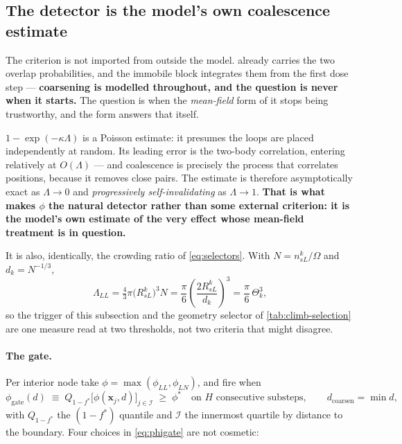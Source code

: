 \documentclass{article}
\begin{document}
\subsection{The detector is the model's own coalescence estimate}
\label{sec:dcoarsen}

The criterion is not imported from outside the model.  already
carries the two overlap probabilities, and the immobile block integrates them
from the first dose step --- \textbf{coarsening is modelled throughout, and the
question is never when it starts.} The question is when the \emph{mean-field}
form of it stops being trustworthy, and the form answers that itself.

$1-\exp(-\kappa\Lambda)$ is a Poisson estimate: it presumes the loops are placed
independently at random. Its leading error is the two-body correlation, entering
relatively at $O(\Lambda)$ --- and coalescence is precisely the process that
correlates positions, because it removes close pairs. The estimate is therefore
asymptotically exact as $\Lambda\to0$ and \emph{progressively self-invalidating}
as $\Lambda\to1$. \textbf{That is what makes $\phi$ the natural detector rather
than some external criterion: it is the model's own estimate of the very effect
whose mean-field treatment is in question.}

It is also, identically, the crowding ratio of \cref{eq:selectors}. With
$N=n^k_{sL}/\Omega$ and $d_k=N^{-1/3}$,
\begin{equation}
  \Lambda_{LL}=\tfrac43\pi \bigl(R^k_{sL}\bigr)^{3}N
              =\frac{\pi}{6}\left(\frac{2R^k_{sL}}{d_k}\right)^{3}
              =\frac{\pi}{6}\,\Theta_k^{3},
  \label{eq:avrami-crowding}
\end{equation}
so the trigger of this subsection and the geometry selector of
\cref{tab:climb-selection} are one measure read at two thresholds, not two
criteria that might disagree.

\paragraph{The gate.} Per interior node take $\phi=\max(\phi_{LL},\phi_{LN})$, and
fire when
\begin{equation}
  \phi_{\mathrm{gate}}(d)\;\equiv\;Q_{1-f^{\ast}}\bigl[\phi(\bm x_j,d)\bigr]_{j\in\mathcal I}
  \;\ge\;\phi^{\ast}
  \quad\text{on $H$ consecutive substeps},
  \qquad
  d_{\mathrm{coarsen}}=\min d ,
  \label{eq:phigate}
\end{equation}
with $Q_{1-f^\ast}$ the $(1-f^\ast)$ quantile and $\mathcal I$ the innermost
quartile by distance to the boundary. Four choices in \cref{eq:phigate} are not
cosmetic:
\end{document}
